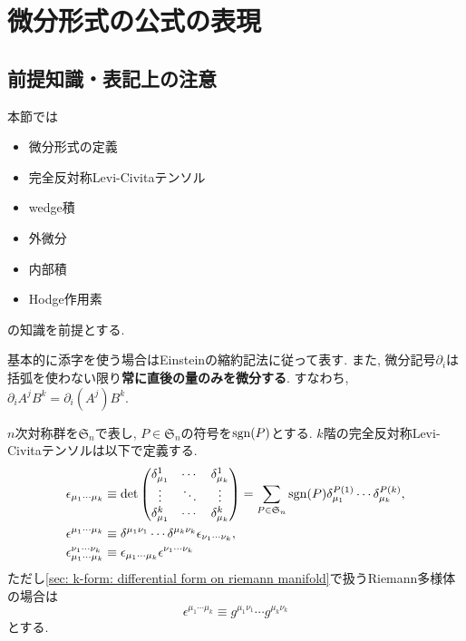 \documentclass[dvipdfmx]{jsarticle}
\begin{document}
\section{微分形式の公式の表現}
\label{sec: k-form}

\subsection{前提知識・表記上の注意}

本節では
\begin{itemize}
    \item 微分形式の定義
    \item 完全反対称Levi-Civitaテンソル
    \item wedge積
    \item 外微分
    \item 内部積
    \item Hodge作用素
\end{itemize}
の知識を前提とする.

基本的に添字を使う場合はEinsteinの縮約記法に従って表す.
また, 微分記号$\partial_i$は括弧を使わない限り\textbf{常に直後の量のみを微分する}.
すなわち, $\partial_iA^jB^k=\partial_i(A^j)B^k$.

$n$次対称群を$\mathfrak{S}_n$で表し, $P\in\mathfrak{S}_n$の符号を$\mathrm{sgn}(P)$とする.
$k$階の完全反対称Levi-Civitaテンソルは以下で定義する.
\begin{align*}
    &
    \epsilon_{\mu_1\cdots\mu_k}
    \equiv
    \det\mqty(
        \delta_{\mu_1}^1 & \cdots & \delta_{\mu_k}^1
        \\
        \vdots & \ddots & \vdots
        \\
        \delta_{\mu_1}^k & \cdots & \delta_{\mu_k}^k
    )
    =
    \sum_{P\in\mathfrak{S}_n}\sgn(P)
    \delta_{\mu_1}^{P(1)}
    \cdots
    \delta_{\mu_k}^{P(k)},
    \\
    &
    \epsilon^{\mu_1\cdots\mu_k}
    \equiv
    \delta^{\mu_1\nu_1}\cdots\delta^{\mu_k\nu_k}
    \epsilon_{\nu_1\cdots\nu_k},
    \\
    &
    \epsilon_{\mu_1\cdots\mu_k}^{\nu_1\cdots\nu_k}
    \equiv
    \epsilon_{\mu_1\cdots\mu_k}
    \epsilon^{\nu_1\cdots\nu_k}
\end{align*}
ただし\ref{sec: k-form: differential form on riemann manifold}で扱うRiemann多様体の場合は
\begin{equation}
    \label{eq: k-form: contravariant Levi-Civita}
    \epsilon^{\mu_1\cdots\mu_k}
    \equiv
    g^{\mu_1\nu_1}\cdots g^{\mu_k\nu_k}
\end{equation}
とする.
\end{document}
